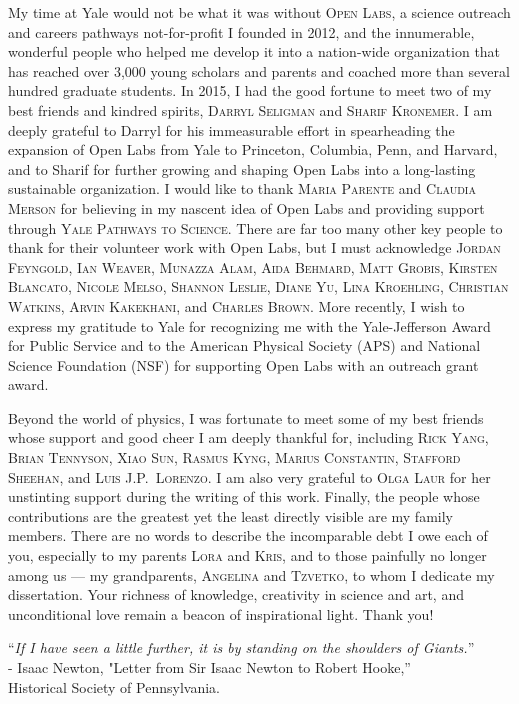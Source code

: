My time at Yale would not be what it was without \textsc{Open Labs}, a science outreach and  careers pathways not-for-profit I founded in 2012, and the innumerable, wonderful people who helped me develop it into a nation-wide organization that has reached over 3,000 young scholars and parents and coached more than several hundred graduate students. In 2015, I had the good fortune to meet two of my best friends and kindred spirits, \textsc{Darryl Seligman} and \textsc{Sharif Kronemer}. I am deeply grateful to Darryl for his immeasurable effort in spearheading the expansion of Open Labs from Yale to Princeton, Columbia, Penn, and Harvard, and to Sharif for further growing and shaping Open Labs into a long-lasting sustainable organization. I would like to thank \textsc{Maria Parente} and \textsc{Claudia Merson} for believing in my nascent idea of Open Labs and providing support through \textsc{Yale Pathways to Science}. There are far too many other key people to thank for their volunteer work with Open Labs, but I must acknowledge \textsc{Jordan Feyngold, Ian Weaver, Munazza Alam, Aida Behmard, Matt Grobis, Kirsten Blancato, Nicole Melso, Shannon Leslie, Diane Yu, Lina Kroehling, Christian Watkins, Arvin Kakekhani}, and \textsc{Charles Brown}. More recently, I wish to express my gratitude to Yale for recognizing me with the Yale-Jefferson Award for Public Service and to the American Physical Society (APS) and National Science Foundation (NSF) for supporting Open Labs with an outreach grant award. 

Beyond the world of physics, I was fortunate to meet some of my best friends whose support and good cheer I am deeply thankful for, including \textsc{Rick Yang, Brian Tennyson, Xiao Sun, Rasmus Kyng, Marius Constantin, Stafford Sheehan}, and \textsc{Luis J.P.~Lorenzo}.  I am also very grateful to \textsc{Olga Laur} for her unstinting support during the writing of this work. Finally, the people whose contributions are the greatest yet the least directly visible are my family members. There are no words to describe the incomparable debt I owe each of you, especially to my parents \textsc{Lora} and \textsc{Kris}, and to those painfully no longer among us --- my grandparents, \textsc{Angelina} and \textsc{Tzvetko}, to whom I dedicate my dissertation. Your richness of knowledge, creativity in science and art, and unconditional love remain a beacon of inspirational light. Thank you!




\begin{center}
	
	``\emph{If I have seen a little further, it is by standing on the shoulders of Giants.}''  \\ - Isaac Newton, "Letter from Sir Isaac Newton to Robert Hooke,'' \\Historical Society of Pennsylvania.
	
\end{center} %






\singlespacing


